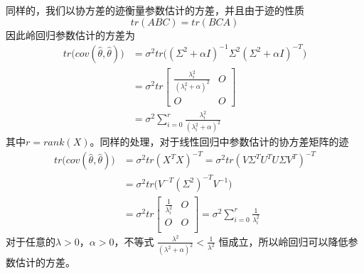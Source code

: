 同样的，我们以协方差的迹衡量参数估计的方差，并且由于迹的性质
\begin{equation}
	tr(ABC) = tr(BCA)
\end{equation}
因此岭回归参数估计的方差为
\begin{equation}
\begin{split}
	tr\big(cov(\hat{\theta}, \hat{\theta})\big) &= \sigma^2 
	tr\big(
	(\Sigma^2 + \alpha I)^{-1}
	\Sigma^2
	(\Sigma^2 + \alpha I)^{-T}
	\big) \\ 
	&= \sigma^2 tr
	\begin{bmatrix}
	\frac{\lambda_i^2}{(\lambda_i^2 + \alpha)^2} & O \\
	O  &  O
	\end{bmatrix}\\
	&= \sigma^2 \sum_{i=0}^r \frac{\lambda_i^2}{(\lambda_i^2 + \alpha)^2}
\end{split}
\end{equation}
其中$r = rank(X)$。同样的处理，对于线性回归中参数估计的协方差矩阵的迹
\begin{equation}
\begin{split}
	tr\big(cov(\hat{\theta}, \hat{\theta})\big) &= \sigma^2tr(X^TX)^{-T} = \sigma^2 tr(V\Sigma^TU^T U\Sigma V^T)^{-T}\\
	&= \sigma^2 tr\big(V^{-T}(\Sigma^2)^{-T} V^{-1}\big) \\
	&= \sigma^2 tr \begin{bmatrix}
	\frac{1}{\lambda_i^2} & O \\
	O & O \\
	\end{bmatrix} = \sigma^2 \sum_{i=0}^r \frac{1}{\lambda_i^2}
\end{split}
\end{equation}
对于任意的$\lambda > 0$，$\alpha > 0$，不等式
$\frac{\lambda^2}{(\lambda^2 + \alpha)^ 2} < \frac{1}{\lambda^2}$
恒成立，所以岭回归可以降低参数估计的方差。










